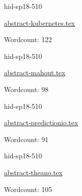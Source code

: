 

\begin{IU}

hid-sp18-510

\href{https://github.com/cloudmesh-community/hid-sp18-510/blob/master//technology/abstract-kubernetes.tex}{abstract-kubernetes.tex}

 

Wordcount: 122

\end{IU}



\begin{IU}

hid-sp18-510

\href{https://github.com/cloudmesh-community/hid-sp18-510/blob/master//technology/abstract-mahout.tex}{abstract-mahout.tex}

 

Wordcount: 98

\end{IU}



\begin{IU}

hid-sp18-510

\href{https://github.com/cloudmesh-community/hid-sp18-510/blob/master//technology/abstract-predictionio.tex}{abstract-predictionio.tex}

 

Wordcount: 91

\end{IU}



\begin{IU}

hid-sp18-510

\href{https://github.com/cloudmesh-community/hid-sp18-510/blob/master//technology/abstract-theano.tex}{abstract-theano.tex}

 

Wordcount: 105

\end{IU}



